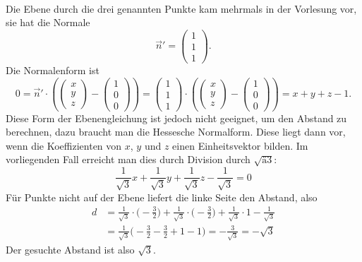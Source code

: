 \begin{loesung}
\begin{align*}
\end{align*}
Die Ebene durch die drei genannten Punkte kam mehrmals in der Vorlesung
vor, sie hat die Normale
\[
\vec n'=\begin{pmatrix}1\\1\\1\end{pmatrix}.
\]
Die Normalenform ist
\[
0
=
\vec n'\cdot \left(\begin{pmatrix}x\\y\\z\end{pmatrix}-\begin{pmatrix}1\\0\\0\end{pmatrix}\right)
=
\begin{pmatrix}1\\1\\1\end{pmatrix}
\cdot \left(\begin{pmatrix}x\\y\\z\end{pmatrix}-\begin{pmatrix}1\\0\\0\end{pmatrix}\right)
=
x+y+z-1.
\]
Diese Form der Ebenengleichung ist jedoch nicht geeignet, um den Abstand
zu berechnen, dazu braucht man die Hessesche Normalform. Diese liegt
dann vor, wenn die Koeffizienten von $x$, $y$ und $z$ einen
Einheitsvektor bilden. Im vorliegenden Fall erreicht man dies durch
Division durch $\sqrt{ä3}$:
\[
\frac1{\sqrt{3}}x
+
\frac1{\sqrt{3}}y
+
\frac1{\sqrt{3}}z
-
\frac1{\sqrt{3}}
=0
\]
Für Punkte nicht auf der Ebene liefert die linke Seite den Abstand,
also 
\begin{align*}
d&=
\frac1{\sqrt{3}}
\cdot
\biggl(-\frac32\biggr)
+
\frac1{\sqrt{3}}
\cdot
\biggl(-\frac32\biggr)
+
\frac1{\sqrt{3}}
\cdot 1
-\frac1{\sqrt{3}}
\\
&=\frac1{\sqrt{3}}\biggl(
-\frac32-\frac32+1-1
\biggr)
=-\frac3{\sqrt{3}}=-\sqrt{3}
\end{align*}
Der gesuchte Abstand ist also $\sqrt{3}$.
\end{loesung}
